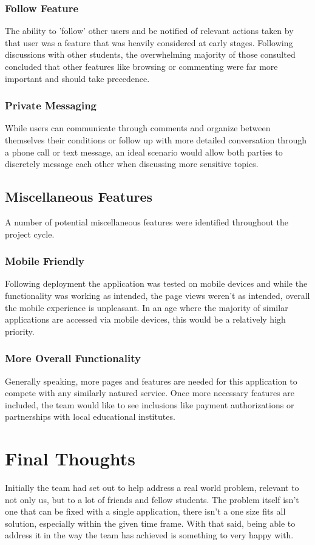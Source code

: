 \subsubsection{Follow Feature}
The ability to 'follow' other users and be notified of relevant actions taken by that user was a feature that was heavily considered at early stages. Following discussions with other students, the overwhelming majority of those consulted concluded that other features like browsing or commenting were far more important and should take precedence.

\subsubsection{Private Messaging}
While users can communicate through comments and organize between themselves their conditions or follow up with more detailed conversation through a phone call or text message, an ideal scenario would allow both parties to discretely message each other when discussing more sensitive topics.

\subsection{Miscellaneous Features}
A number of potential miscellaneous features were identified throughout the project cycle.

\subsubsection{Mobile Friendly}
Following deployment the application was tested on mobile devices and while the functionality was working as intended, the page views weren't as intended, overall the mobile experience is unpleasant. In an age where the majority of similar applications are accessed via mobile devices, this would be a relatively high priority.

\subsubsection{More Overall Functionality}
Generally speaking, more pages and features are needed for this application to compete with any similarly natured service. Once more necessary features are included, the team would like to see inclusions like payment authorizations or partnerships with local educational institutes.

\newpage

\section{Final Thoughts}
Initially the team had set out to help address a real world problem, relevant to not only us, but to a lot of friends and fellow students. The problem itself isn't one that can be fixed with a single application, there isn't a one size fits all solution, especially within the given time frame. With that said, being able to address it in the way the team has achieved is something to very happy with.

